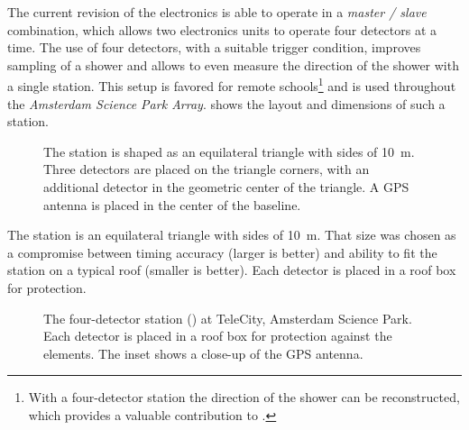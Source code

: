 The current revision of the electronics is able to operate in a
\emph{master / slave} combination, which allows two electronics units to operate
four detectors at a time.  The use of four detectors, with a suitable trigger
condition, improves sampling of a shower and allows to even measure the
direction of the shower with a single station.  This setup is favored for remote
schools\footnote{With a four-detector station the direction of the shower can be
reconstructed, which provides a valuable contribution to \hisparc.}
and is used throughout the \emph{Amsterdam Science Park Array}.
 shows the layout and dimensions of such a station.
\begin{figure}
\centering

\caption{ The station is shaped as an equilateral triangle with sides of
\SI{10}{\meter}. Three detectors are placed on the triangle corners, with an
additional detector in the geometric center of the triangle. A GPS antenna is
placed in the center of the baseline.}
\label{fig:station-layout}
\end{figure}
The station is an equilateral triangle with sides of \SI{10}{\meter}.  That size
was chosen as a compromise between timing accuracy (larger is better) and ability to
fit the station on a typical roof (smaller is better).  Each detector is placed
in a roof box for protection.

\begin{figure}
\centering
{}
\caption{The four-detector \hisparc station () at
TeleCity, Amsterdam Science Park. Each detector is placed in a roof box for
protection against the elements. The inset shows a close-up of the GPS antenna.}
\end{figure}


